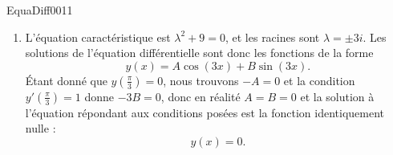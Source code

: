 \begin{corrige}{EquaDiff0011}
\begin{enumerate}
	\item
		L'équation caractéristique est $\lambda^2+9=0$, et les racines sont $\lambda=\pm 3i$. Les solutions  de l'équation différentielle sont donc les fonctions de la forme
		\begin{equation}
			y(x)=A\cos(3x)+B\sin(3x).
		\end{equation}
		Étant donné que $y(\frac{ \pi }{ 3 })=0$, nous trouvons $-A=0$ et la condition $y'(\frac{ \pi }{ 3 })=1$ donne $-3B=0$, donc en réalité $A=B=0$ et la solution à l'équation répondant aux conditions posées est la fonction identiquement nulle :
		\begin{equation}
			y(x)=0.
		\end{equation}

\end{enumerate}

\end{corrige}
